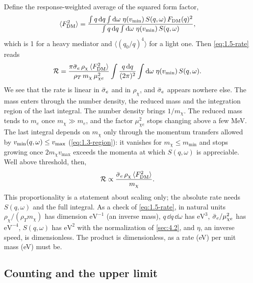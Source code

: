 Define the response-weighted average of the squared form factor,
\begin{equation}
  \langle F_{\mathrm{DM}}^2\rangle = \frac{\int q\,\mathrm{d} q\int\mathrm{d}\omega\;\eta(v_{\mathrm{min}})\,S(q,\omega)\,F_{\mathrm{DM}}(q)^2}{\int q\,\mathrm{d} q\int\mathrm{d}\omega\;\eta(v_{\mathrm{min}})\,S(q,\omega)} ,
  \label{eq:1.5-FDMavg}
\end{equation}
which is 1 for a heavy mediator and $\langle(q_0/q)^4\rangle$ for a light one. Then \cref{eq:1.5-rate} reads
\begin{equation}
  \mathcal{R} = \frac{\pi\bar{\sigma}_{e}\,\rho_\chi\,\langle F_{\mathrm{DM}}^2\rangle}{\rho_T\, m_\chi\,\mu_{\chi e}^2}\int\frac{q\,\mathrm{d} q}{(2\pi)^2}\int\mathrm{d}\omega\;\eta(v_{\mathrm{min}})\,S(q,\omega) .
  \label{eq:1.5-scaling}
\end{equation}
We see that the rate is linear in $\bar{\sigma}_{e}$ and in $\rho_\chi$, and $\bar{\sigma}_{e}$ appears nowhere else. The mass enters through the number density, the reduced mass and the integration region of the last integral. The number density brings $1/m_\chi$. The reduced mass tends to $m_e$ once $m_\chi \gg m_e$, and the factor $\mu_{\chi e}^2$ stops changing above a few MeV. The last integral depends on $m_\chi$ only through the momentum transfers allowed by $v_{\mathrm{min}}(q,\omega) \le v_{\mathrm{max}}$ (\cref{eq:1.3-region}): it vanishes for $m_\chi \le m_{\mathrm{min}}$ and stops growing once $2m_\chi v_{\mathrm{max}}$ exceeds the momenta at which $S(q,\omega)$ is appreciable. Well above threshold, then,
\begin{equation}
  \mathcal{R} \propto \frac{\bar{\sigma}_{e}\,\rho_\chi\,\langle F_{\mathrm{DM}}^2\rangle}{m_\chi} .
  \label{eq:1.5-heuristic}
\end{equation}
This proportionality is a statement about scaling only; the absolute rate needs $S(q,\omega)$ and the full integral. As a check of \cref{eq:1.5-rate}, in natural units $\rho_\chi/(\rho_T m_\chi)$ has dimension $\mathrm{eV}^{-1}$ (an inverse mass), $q\,\dd q\,\dd\omega$ has $\mathrm{eV}^3$, $\bar{\sigma}_{e}/\mu_{\chi e}^2$ has $\mathrm{eV}^{-4}$, $S(q,\omega)$ has $\mathrm{eV}^2$ with the normalization of \cref{sec:4.2}, and $\eta$, an inverse speed, is dimensionless. The product is dimensionless, as a rate (eV) per unit mass (eV) must be.

\subsection{Counting and the upper limit}\label{sec:1.5-limit}

